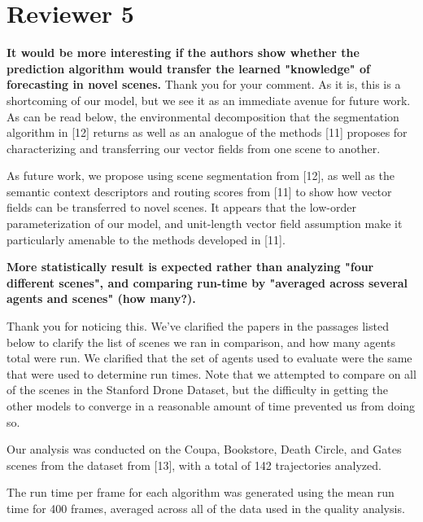 \documentclass[usenames,dvipsnames]{article}
\providecommand{\response}[1]{
\noindent
\noindent\colorbox{gray!20}{
\parbox{\textwidth}{
\setlength{\parskip}{.1in}
\setlength{\parindent}{.1in}
#1}
}
}
\begin{document}
\begin{enumerate}
\begin{item}
\end{item}

\end{enumerate}

\section*{Reviewer 5}
\begin{enumerate}
\begin{item}
\textbf{
It would be more interesting if the authors show whether
the prediction algorithm would transfer the learned "knowledge" of
forecasting in novel scenes.}
Thank you for your comment. As it is, this is a shortcoming of our model, but we see it as an immediate avenue for future work. As can be read below, the environmental decomposition that the segmentation algorithm in [12] returns as well as an analogue of the methods [11] proposes for characterizing and transferring our vector fields from one scene to another.

\response{As future work, we propose using scene segmentation from [12], as well as the semantic context descriptors and routing scores from [11] to show how vector fields can be transferred to novel scenes. It appears that the low-order parameterization of our model, and unit-length vector field assumption make it particularly amenable to the methods developed in [11].}


\end{item}
\begin{item}
\textbf{
More statistically result is expected
rather than analyzing "four different scenes", and comparing run-time
by "averaged across several agents and scenes" (how many?).}

Thank you for noticing this. We've clarified the papers in the passages listed below to clarify the list of scenes we ran in comparison, and how many agents total were run. We clarified that the set of agents used to evaluate were the same that were used to determine run times. Note that we attempted to compare on all of the scenes in the Stanford Drone Dataset, but the difficulty in getting the other models to converge in a reasonable amount of time prevented us from doing so.

\response{ Our analysis was conducted on the Coupa, Bookstore, Death Circle, and Gates scenes from the dataset from [13], with a total of 142 trajectories analyzed.}

\response{The run time per frame for each algorithm was generated using the mean run time for 400 frames, averaged across all of the data used in the quality analysis.}
\end{item}


\end{enumerate}
\end{document}

